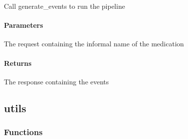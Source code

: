 \documentclass[letterpaper,10pt,english]{sphinxmanual}
\begin{document}

\begin{fulllineitems}
\label{\detokenize{autoapi/app/index:app.run_pipeline}}
\pysigstartsignatures
{}
\pysigstopsignatures
\sphinxAtStartPar
Call generate\_events to run the pipeline


\paragraph{Parameters}
\label{\detokenize{autoapi/app/index:id1}}\begin{description}
\sphinxAtStartPar
The request containing the informal name of the medication

\end{description}


\paragraph{Returns}
\label{\detokenize{autoapi/app/index:returns}}\begin{description}
\sphinxAtStartPar
The response containing the events

\end{description}

\end{fulllineitems}


\sphinxstepscope


\subsection{utils}
\label{\detokenize{autoapi/utils/index:module-utils}}\label{\detokenize{autoapi/utils/index:utils}}\label{\detokenize{autoapi/utils/index::doc}}

\subsubsection{Functions}
\label{\detokenize{autoapi/utils/index:functions}}
\end{document}
